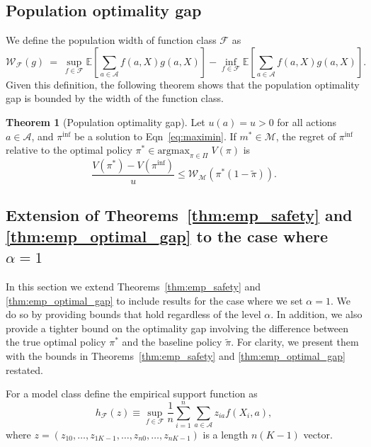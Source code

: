 \documentclass[12pt]{article}
\theoremstyle{definition}
\newtheorem{theorem}{Theorem}
\newcommand{\E}{\ensuremath{\mathbb{E}}}
\newcommand{\argmax}{\text{argmax}}
\newcommand{\<}{\langle}
\renewcommand{\>}{\rangle}
\newcommand\mcal[1]{\ensuremath{\mathcal{#1}}}
\begin{document}
\subsection{Population optimality gap}
\label{sec:pop_opt_gap}
We define the population width of function class $\mathcal{F}$ as
\[
  \mcal{W}_{\mcal{F}}(g) \  = \ \sup_{f \in \mcal{F}} \E\left[\sum_{a \in \mathcal{A}} f(a, X) g(a, X)\right] - \inf_{f \in \mcal{F}} \E\left[\sum_{a \in \mathcal{A}} f(a, X) g(a, X)\right].
\]
Given this definition, the following theorem shows that the population
optimality gap is bounded by the width of the function class.
\begin{theorem}[Population optimality gap]
  \label{thm:pop_optimal_gap} \singlespacing Let $u(a) = u > 0$ for
  all actions $a \in \mcal{A}$, and $\pi^{\inf}$ be a solution to
  Eqn~\eqref{eq:maximin}. If $m^\ast \in \mcal{M}$, the regret of
  $\pi^{\inf}$ relative to the optimal policy
  $\pi^\ast \in \argmax_{\pi \in \Pi} \; V(\pi)$ is
  \[
    \frac{V(\pi^\ast) - V(\pi^{\inf})}{u} \leq \mcal{W}_{\mcal{M}}(\pi^\ast(1-\tilde{\pi})).
  \]
\end{theorem}

\subsection{Extension of Theorems~\ref{thm:emp_safety} and \ref{thm:emp_optimal_gap} to the case where $\alpha = 1$}
\label{sec:alpha_1}

In this section we extend Theorems~\ref{thm:emp_safety} and \ref{thm:emp_optimal_gap} to include results for the case where we set $\alpha = 1$. We do so by providing bounds that hold regardless of the level $\alpha$.
In addition, we also provide a tighter bound on the optimality gap involving the difference between the true optimal policy $\pi^\ast$ and the
baseline policy $\tilde{\pi}$.
For clarity, we present them with the bounds in Theorems~\ref{thm:emp_safety} and \ref{thm:emp_optimal_gap} restated.



For a model class define
the empirical support function as
\[h_\mathcal{F}(z) \equiv \sup_{f \in \mathcal{F}} \frac{1}{n}\sum_{i=1}^n\sum_{a \in \mathcal{A}} z_{ia} f(X_i, a),\]
where $z = (z_{10},\ldots,z_{1K-1}, \ldots, z_{n0}, \ldots, z_{nK-1})$ is a length $n(K-1)$ vector.
\end{document}
